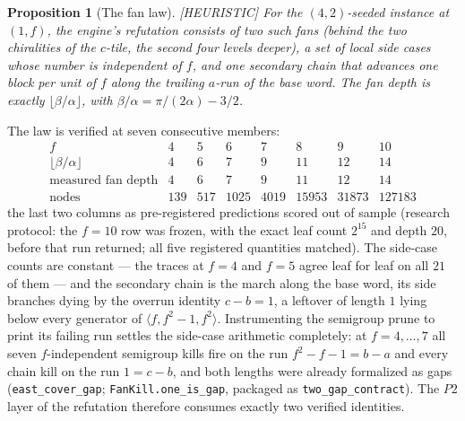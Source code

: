 \documentclass[11pt,reqno]{amsart}
\theoremstyle{plain}
\newtheorem{proposition}[theorem]{Proposition}
\theoremstyle{definition}
\newcommand{\lab}[1]{\hfill\textnormal{\footnotesize\textsc{[#1]}}}
\begin{document}
\begin{proposition}[The fan law]\label{prop:fanlaw}\lab{HEURISTIC}
For the $(4,2)$-seeded instance at $(1,f)$, the engine's refutation consists of two such fans
(behind the two chiralities of the $c$-tile, the second four levels deeper), a set of local side
cases whose number is independent of $f$, and one secondary chain that advances one block per unit
of $f$ along the trailing $a$-run of the base word. The fan depth is exactly
$\lfloor\beta/\alpha\rfloor$, with $\beta/\alpha=\pi/(2\alpha)-3/2$.
\end{proposition}

The law is verified at seven consecutive members:
\[
\begin{array}{r|ccccccc}
f & 4 & 5 & 6 & 7 & 8 & 9 & 10\\\hline
\lfloor\beta/\alpha\rfloor & 4 & 6 & 7 & 9 & 11 & 12 & 14\\
\text{measured fan depth} & 4 & 6 & 7 & 9 & 11 & 12 & 14\\
\text{nodes} & 139 & 517 & 1025 & 4019 & 15953 & 31873 & 127183
\end{array}
\]
the last two columns as pre-registered predictions scored out of sample (research protocol: the
$f=10$ row was frozen, with the exact leaf count $2^{15}$ and depth $20$, before that run
returned; all five registered quantities matched). The side-case counts are constant --- the
traces at $f=4$ and $f=5$ agree leaf for leaf on all $21$ of them --- and the secondary chain is
the march along the base word, its side branches dying by the overrun identity $c-b=1$, a leftover
of length $1$ lying below every generator of $\langle f,f^2-1,f^2\rangle$. Instrumenting the
semigroup prune to print its failing run settles the side-case arithmetic completely: at
$f=4,\dots,7$ all seven $f$-independent semigroup kills fire on the run $f^2-f-1=b-a$ and every
chain kill on the run $1=c-b$, and both lengths were already formalized as gaps
(\texttt{east\_cover\_gap}; \texttt{FanKill.one\_is\_gap}, packaged as
\texttt{two\_gap\_contract}). The $P2$ layer of the refutation therefore consumes exactly two
verified identities.
\end{document}
